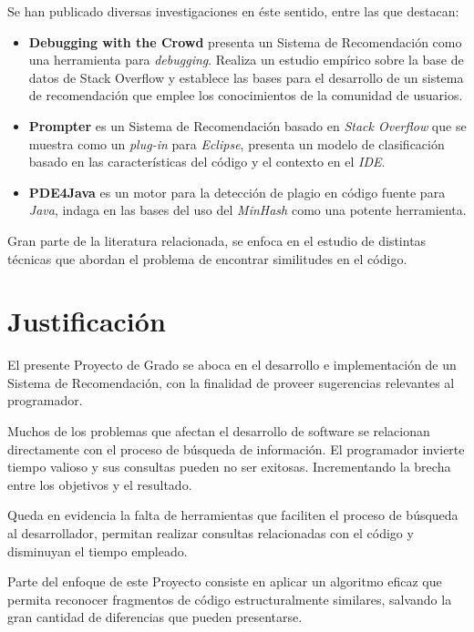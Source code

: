 Se han publicado diversas investigaciones en éste sentido, entre las que destacan:

\begin{itemize}
	\item \textbf{Debugging with the Crowd}\cite{monperrus:hal-00987395}
	presenta un Sistema de Recomendación como una herramienta para \textit{debugging}.
	Realiza un estudio empírico sobre la base de datos de Stack Overflow y establece las bases
	para el desarrollo de un sistema de recomendación que emplee los conocimientos de la comunidad de usuarios.
	
	\item \textbf{Prompter}\cite{Ponzanelli:2014:PSR:2705615.2706035} es un Sistema de Recomendación
	basado en \textit{Stack Overflow} que se muestra como un \textit{plug-in} para \textit{Eclipse},
	presenta un modelo de clasificación basado en las características del código y el contexto en
	el \textit{IDE}.

	\item \textbf{PDE4Java}\cite{Jadalla:2008:PPD:1413814.1413815} es un motor 
	para la detección de plagio en código fuente para \textit{Java}, indaga en
	las bases del uso del \textit{MinHash} como una potente herramienta.
\end{itemize}

Gran parte de la literatura relacionada, se enfoca en el estudio de distintas técnicas
que abordan el problema de encontrar similitudes en el código.

\section*{Justificación}

El presente Proyecto de Grado se aboca en el desarrollo e implementación de 
un Sistema de Recomendación, con la finalidad de proveer sugerencias 
relevantes al programador.

Muchos de los problemas que afectan el desarrollo de software se relacionan
directamente con el proceso de búsqueda de información. El programador
invierte tiempo valioso y sus consultas pueden no ser exitosas.
Incrementando la brecha entre los objetivos y el resultado.

Queda en evidencia la falta de herramientas
que faciliten el proceso de búsqueda al desarrollador,
permitan realizar consultas relacionadas con el código
y disminuyan el tiempo empleado.

Parte del enfoque de este Proyecto consiste en aplicar un algoritmo
eficaz que permita reconocer fragmentos de código estructuralmente similares,
salvando la gran cantidad de diferencias que pueden presentarse.

